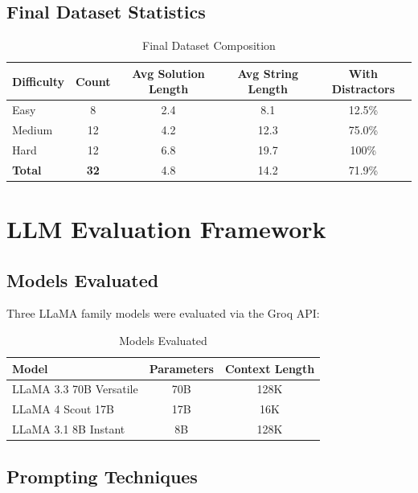\documentclass[11pt,a4paper]{article}
\begin{document}
\subsection{Final Dataset Statistics}

\begin{table}[H]
\centering
\caption{Final Dataset Composition}
\begin{tabular}{lcccc}
\toprule
\textbf{Difficulty} & \textbf{Count} & \textbf{Avg Solution Length} & \textbf{Avg String Length} & \textbf{With Distractors} \\
\midrule
Easy & 8 & 2.4 & 8.1 & 12.5\% \\
Medium & 12 & 4.2 & 12.3 & 75.0\% \\
Hard & 12 & 6.8 & 19.7 & 100\% \\
\midrule
\textbf{Total} & \textbf{32} & 4.8 & 14.2 & 71.9\% \\
\bottomrule
\end{tabular}
\end{table}

\section{LLM Evaluation Framework}

\subsection{Models Evaluated}

Three LLaMA family models were evaluated via the Groq API:

\begin{table}[H]
\centering
\caption{Models Evaluated}
\begin{tabular}{lcc}
\toprule
\textbf{Model} & \textbf{Parameters} & \textbf{Context Length} \\
\midrule
LLaMA 3.3 70B Versatile & 70B & 128K \\
LLaMA 4 Scout 17B & 17B & 16K \\
LLaMA 3.1 8B Instant & 8B & 128K \\
\bottomrule
\end{tabular}
\end{table}

\subsection{Prompting Techniques}
\end{document}
